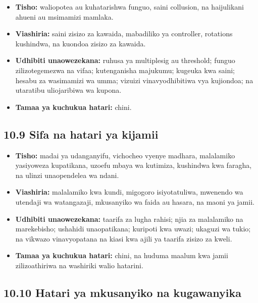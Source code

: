 \documentclass[11pt]{article}
\begin{document}
\begin{itemize}[leftmargin=*]
\item \textbf{Tisho:} waliopotea au kuhatarishwa funguo, saini collusion, na haijulikani ahueni au msimamizi mamlaka.
\item \textbf{Viashiria:} saini zisizo za kawaida, mabadiliko ya controller, rotations kushindwa, na kuondoa zisizo za kawaida.
\item \textbf{Udhibiti unaowezekana:} ruhusa ya multiplesig au threshold; funguo zilizotegemezwa na vifaa; kutenganisha majukumu; kugeuka kwa saini; hesabu za wasimamizi wa umma; vizuizi vinavyodhibitiwa vya kujiondoa; na utaratibu uliojaribiwa wa kupona.
\item \textbf{Tamaa ya kuchukua hatari:} chini.
\end{itemize}
\subsection*{10.9 Sifa na hatari ya kijamii}

\begin{itemize}[leftmargin=*]
\item \textbf{Tisho:} madai ya udanganyifu, vichocheo vyenye madhara, malalamiko yasiyoweza kupatikana, uzoefu mbaya wa kutimiza, kushindwa kwa faragha, na ulinzi unaopendelea wa ndani.
\item \textbf{Viashiria:} malalamiko kwa kundi, migogoro isiyotatuliwa, mwenendo wa utendaji wa watangazaji, mkusanyiko wa faida au hasara, na maoni ya jamii.
\item \textbf{Udhibiti unaowezekana:} taarifa za lugha rahisi; njia za malalamiko na marekebisho; ushahidi unaopatikana; kuripoti kwa uwazi; ukaguzi wa tukio; na vikwazo vinavyopatana na kiasi kwa ajili ya taarifa zisizo za kweli.
\item \textbf{Tamaa ya kuchukua hatari:} chini, na huduma maalum kwa jamii zilizoathiriwa na washiriki walio hatarini.
\end{itemize}
\subsection*{10.10 Hatari ya mkusanyiko na kugawanyika}
\end{document}
